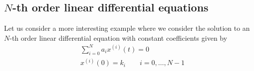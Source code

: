 \documentclass[a4paper,11pt]{exam}
\newcounter{ct}
\begin{document}
\begin{questions}
\subsection{$N$-th order linear differential equations}
Let us consider a more interesting example where we consider the solution to an $N$-th order linear differential equation with constant coefficients given by
\begin{align}
    &\sum_{i=0}^N a_i x^{(i)}(t) = 0\\
    &x^{(i)}(0) = k_i \qquad i = 0, \ldots, N-1
\end{align}



\end{questions}
\end{document}
